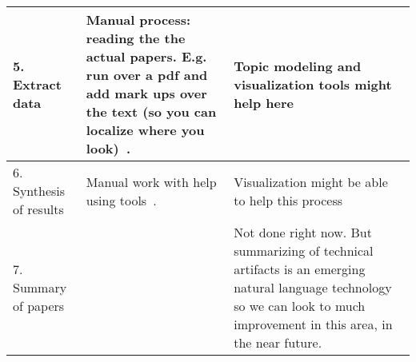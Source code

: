\begin{table}
\begin{center}
{\begin{tabular}{p{1.5cm}|p{5.5cm}|p{8.3cm}}
    \\    \hline
    5. \newline Extract data & Manual process: reading the the actual papers. E.g. run over a pdf and add mark ups over the text (so you can localize where you look)~\cite{kitchenham2004evidence,keele2007guidelines}.  & Topic modeling and visualization tools might help here~\cite{Felizardo2010An,Torres2012Automatic}\\
    \hline\rowcolor{blue!10}
    6. \newline Synthesis of results &  Manual work with help using  tools~\cite{kitchenham2004evidence,keele2007guidelines,marshall2013tools}. & Visualization might be able to help this process~\cite{Cruzes2007Using,Felizardo2011Analysing,Felizardo2010An} \\
    \hline
    7. \newline Summary of papers&   & Not done right now. But summarizing of technical artifacts is an emerging natural language technology~\cite{gambhir2017recent} so we can look to much improvement in this area, in the near future. \\\hline
  \end{tabular}
 
}
\end{center}


\end{table} 